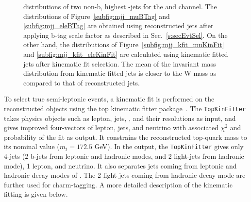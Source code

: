 \begin{figure}
    \caption{\mjj distributions of two non-b, highest \pt-jets for the 
     \mujets and \ejets channel. The distributions of 
     Figure~\ref{subfig:mjj_muBTag} and \ref{subfig:mjj_eleBTag} are obtained 
     using reconstructed jets after applying b-tag scale factor as described 
     in Sec.~\ref{s:secEvtSel}. On the other hand, the distributions of 
     Figure~\ref{subfig:mjj_kfit_muKinFit} and \ref{subfig:mjj_kfit_eleKinFit} 
     are calculated using kinematic fitted jets after kinematic fit selection. 
     The mean of the invariant mass distribution from kinematic fitted jets 
     is closer to the W mass as compared to that of reconstructed jets.}
    \label{fig:mjjBTagKinFit}
\end{figure}

To select true semi-leptonic \ttbar events, a kinematic fit is performed on the 
reconstructed objects using the top kinematic fitter package~\cite{DHondt:2006iej}. 
The \verb|TopKinFitter| takes physics objects such as lepton, jets, \MET, and their 
resolutions as input, and gives improved four-vectors of lepton, jets, and neutrino with 
associated $\chi^2$ and probability of the fit as output. It constrains the reconstructed 
top-quark mass to its nominal value ($m_t = 172.5$ GeV). In the output, the 
\verb|TopKinFitter| gives only 4-jets (2 b-jets from leptonic and hadronic modes, and 2 
light-jets from hadronic mode), 1 lepton, and neutrino. It also separates jets coming from
leptonic and hadronic decay modes of \ttbar. The 2 light-jets coming from hadronic 
decay mode are further used for charm-tagging. A more detailed description of the 
kinematic fitting is given below.

